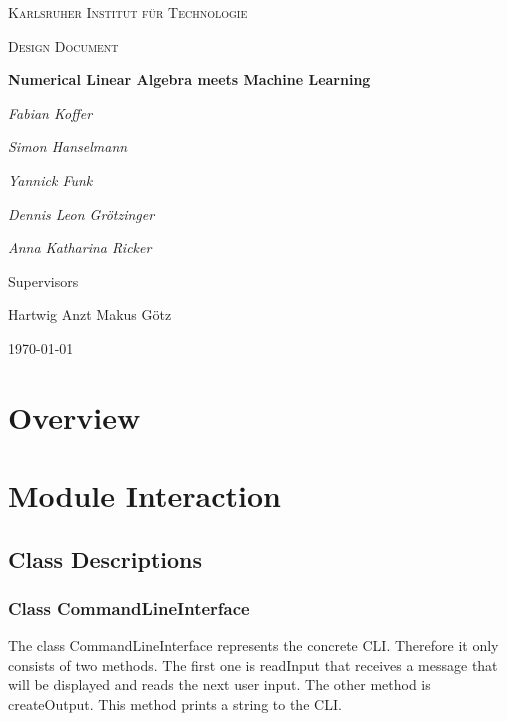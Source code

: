 \documentclass[parskip=full]{scrartcl}
\begin{document}
\begin{titlepage}
\centering
{\scshape\LARGE Karlsruher Institut für Technologie\par}
\vspace{1cm}
{\scshape\Large Design Document\par}
\vspace{1.5cm}
{\huge\bfseries Numerical Linear Algebra meets Machine Learning \par}
\vspace {2cm}

{\Large\itshape Fabian Koffer\par}
{\Large\itshape Simon Hanselmann\par}
{\Large\itshape Yannick Funk\par}
{\Large\itshape Dennis Leon Gr\"{o}tzinger\par}
{\Large\itshape Anna Katharina Ricker\par}

\vfill
Supervisors\par
Hartwig Anzt
Makus G\"{o}tz

\vfill
{\large\today\par}
\end{titlepage}

\tableofcontents
\newpage

\section{Overview}


\section{Module Interaction}

\subsection{Class Descriptions}

\subsubsection{Class CommandLineInterface}
The class CommandLineInterface represents the concrete \gls{CLI}. 
Therefore it only consists of two methods. 
The first one is readInput that receives a message that will be displayed and reads the next user input. 
The other method is createOutput. 
This method prints a string to the \gls{CLI}.
\end{document}
